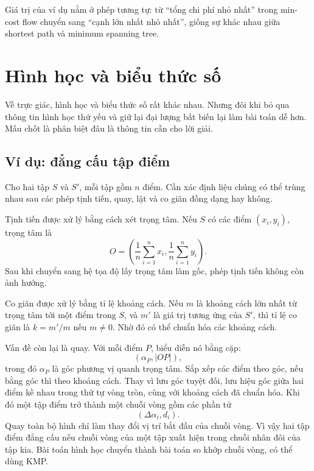 \documentclass[11pt]{article}
\begin{document}
Giá trị của ví dụ nằm ở phép tương tự: từ ``tổng chi phí nhỏ nhất'' trong
min-cost flow chuyển sang ``cạnh lớn nhất nhỏ nhất'', giống sự khác nhau giữa
shortest path và minimum spanning tree.

\section{Hình học và biểu thức số}

Về trực giác, hình học và biểu thức số rất khác nhau. Nhưng đôi khi bỏ qua
thông tin hình học thứ yếu và giữ lại đại lượng bất biến lại làm bài toán dễ
hơn. Mấu chốt là phân biệt đâu là thông tin cần cho lời giải.

\subsection{Ví dụ: đẳng cấu tập điểm}

Cho hai tập \(S\) và \(S'\), mỗi tập gồm \(n\) điểm. Cần xác định liệu chúng
có thể trùng nhau sau các phép tịnh tiến, quay, lật và co giãn đồng dạng hay
không.

Tịnh tiến được xử lý bằng cách xét trọng tâm. Nếu \(S\) có các điểm
\((x_i,y_i)\), trọng tâm là
\[
  O=\left(\frac{1}{n}\sum_{i=1}^{n}x_i,\frac{1}{n}\sum_{i=1}^{n}y_i\right).
\]
Sau khi chuyển sang hệ tọa độ lấy trọng tâm làm gốc, phép tịnh tiến không còn
ảnh hưởng.

Co giãn được xử lý bằng tỉ lệ khoảng cách. Nếu \(m\) là khoảng cách lớn nhất
từ trọng tâm tới một điểm trong \(S\), và \(m'\) là giá trị tương ứng của
\(S'\), thì tỉ lệ co giãn là \(k=m'/m\) nếu \(m\ne0\). Nhờ đó có thể chuẩn hóa
các khoảng cách.

Vấn đề còn lại là quay. Với mỗi điểm \(P\), biểu diễn nó bằng cặp:
\[
  (\alpha_P, |OP|),
\]
trong đó \(\alpha_P\) là góc phương vị quanh trọng tâm. Sắp xếp các điểm theo
góc, nếu bằng góc thì theo khoảng cách. Thay vì lưu góc tuyệt đối, lưu hiệu
góc giữa hai điểm kề nhau trong thứ tự vòng tròn, cùng với khoảng cách đã
chuẩn hóa. Khi đó một tập điểm trở thành một chuỗi vòng gồm các phần tử
\[
  (\Delta\alpha_i, d_i).
\]
Quay toàn bộ hình chỉ làm thay đổi vị trí bắt đầu của chuỗi vòng. Vì vậy hai
tập điểm đẳng cấu nếu chuỗi vòng của một tập xuất hiện trong chuỗi nhân đôi
của tập kia. Bài toán hình học chuyển thành bài toán so khớp chuỗi vòng, có
thể dùng KMP.
\end{document}
